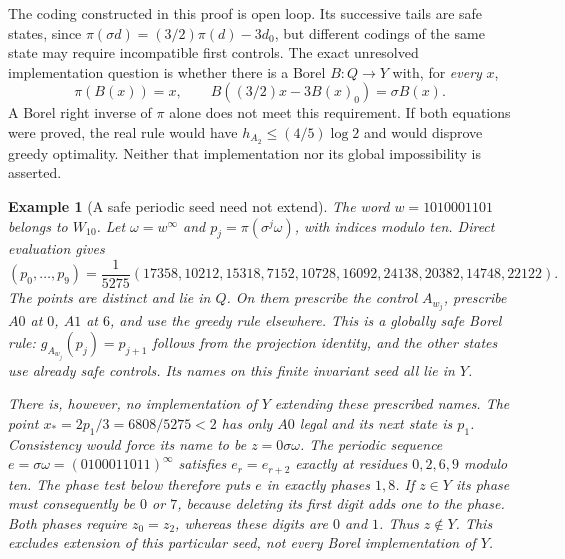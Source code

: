 \documentclass[11pt,reqno]{amsart}
\numberwithin{equation}{section}
\newtheorem{example}[theorem]{Example}
\theoremstyle{definition}
\begin{document}
The coding constructed in this proof is open loop. Its successive
tails are safe states, since
$\pi(\sigma d)=(3/2)\pi(d)-3d_0$, but different codings
of the same state may require incompatible first controls.
The exact unresolved implementation question is whether there is
a Borel $B:Q\to Y$ with, for \emph{every} $x$,
\begin{equation}\label{eq:implementation}
 \pi(B(x))=x,\qquad
 B((3/2)x-3B(x)_0)=\sigma B(x).
\end{equation}
A Borel right inverse of $\pi$ alone does not meet this requirement.
If both equations were proved, the real rule would have
$h_{A_2}\le(4/5)\log2$ and would disprove greedy optimality.
Neither that implementation nor its global impossibility is asserted.


\begin{example}[A safe periodic seed need not extend]
\label{ex:periodic-seed}
The word $w=1010001101$ belongs to $W_{10}$. Let
$\omega=w^\infty$ and $p_j=\pi(\sigma^j\omega)$, with indices
modulo ten. Direct evaluation gives
\[
 (p_0,\ldots,p_9)=\frac1{5275}
 (17358,10212,15318,7152,10728,16092,24138,20382,14748,22122).
\]
The points are distinct and lie in $Q$. On them prescribe the
control $A_{w_j}$, prescribe $A0$ at $0$, $A1$ at $6$, and use
the greedy rule elsewhere. This is a globally safe Borel rule:
$g_{A_{w_j}}(p_j)=p_{j+1}$ follows from the projection identity,
and the other states use already safe controls. Its names on
this finite invariant seed all lie in $Y$.

There is, however, no implementation of $Y$ extending these
prescribed names. The point
$x_*=2p_1/3=6808/5275<2$ has only $A0$ legal and its next
state is $p_1$. Consistency would force its name to be
$z=0\sigma\omega$. The periodic sequence
$e=\sigma\omega=(0100011011)^\infty$ satisfies
$e_r=e_{r+2}$ exactly at residues $0,2,6,9$ modulo ten.
The phase test below therefore puts $e$ in exactly phases $1,8$.
If $z\in Y$ its phase must consequently be $0$ or $7$, because
deleting its first digit adds one to the phase. Both phases require
$z_0=z_2$, whereas these digits are $0$ and $1$.
Thus $z\notin Y$. This excludes extension of this particular
seed, not every Borel implementation of $Y$.
\end{example}
\end{document}
